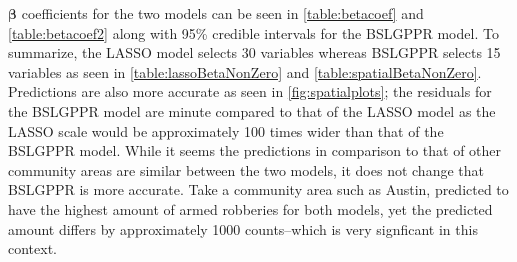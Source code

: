 \documentclass{article} %
\begin{document}
$\boldsymbol{\beta}$ coefficients for the two models can be seen in \autoref{table:betacoef} and \autoref{table:betacoef2} along with 95\% credible intervals for the BSLGPPR model. To summarize, the LASSO model selects 30 variables whereas BSLGPPR selects 15 variables as seen in \autoref{table:lassoBetaNonZero} and \autoref{table:spatialBetaNonZero}. Predictions are also more accurate as seen in \autoref{fig:spatialplots}; the residuals for the BSLGPPR model are minute compared to that of the LASSO model as the LASSO scale would be approximately 100 times wider than that of the BSLGPPR model. While it seems the predictions in comparison to that of other community areas are similar between the two models, it does not change that BSLGPPR is more accurate. Take a community area such as Austin, predicted to have the highest amount of armed robberies for both models, yet the predicted amount differs by approximately 1000 counts--which is very signficant in this context. 
\end{document}
